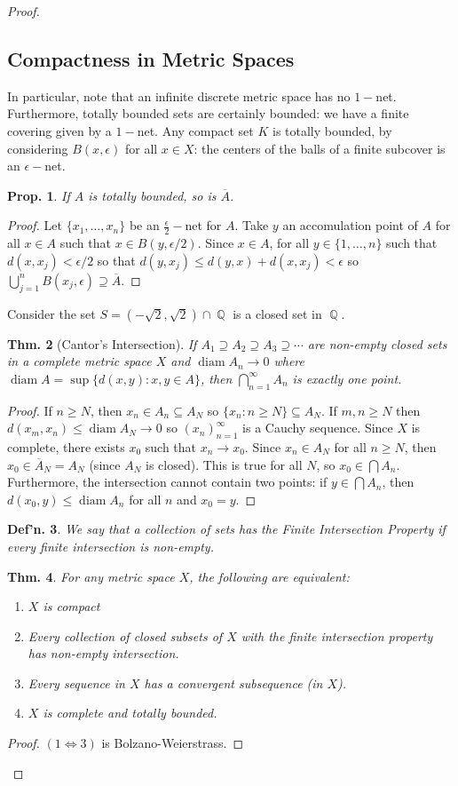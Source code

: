 \documentclass[12pt, a4paper]{book}
\DeclareMathOperator{\Q}{\mathbb{Q}}
\DeclareMathOperator{\diam}{diam}
\newtheorem{theorem}{Thm.}[section]
\newtheorem{definition}[theorem]{Def'n.}
\newtheorem{proposition}[theorem]{Prop.}
\theoremstyle{nonumberplain}
\newtheorem{proof}{Proof}
\begin{document}
\begin{proof}
\subsection{Compactness in Metric Spaces}
In particular, note that an infinite discrete metric space has no $1-$net. Furthermore, totally bounded sets are certainly
bounded: we have a finite covering given by a $1-$net. Any compact set $K$ is totally bounded, by considering $B(x,\epsilon)$
for all $x\in X$: the centers of the balls of a finite subcover is an $\epsilon-$net.
\begin{proposition}
    If $A$ is totally bounded, so is $\overline{A}$.
\end{proposition}
\begin{proof}
    Let $\{x_1,\ldots,x_n\}$ be an $\frac{\epsilon}{2}-$net for $A$. Take $y$ an accomulation point of $A$ for all $x\in A$
    such that $x\in B(y,\epsilon/2)$. Since $x\in A$, for all $y\in\{1,\ldots,n\}$ such that $d(x,x_j)<\epsilon/2$
    so that $d(y,x_j)\leq d(y,x)+d(x,x_j)<\epsilon$ so $\bigcup_{j=1}^n B(x_j,\epsilon)\supseteq\overline{A}$.
\end{proof}
Consider the set $S=(-\sqrt{2},\sqrt{2})\cap\Q$ is a closed set in $\Q$.
\begin{theorem}[Cantor's Intersection]
    If $A_1\supseteq A_2\supseteq A_3\supseteq\cdots$ are non-empty closed sets in a complete metric space $X$ and $\diam A_n\to 0$
    where $\diam A=\sup\{d(x,y):x,y\in A\}$, then $\bigcap_{n=1}^\infty A_n$ is exactly one point.
\end{theorem}
\begin{proof}
    If $n\geq N$, then $x_n\in A_n\subseteq A_N$ so $\{x_n:n\geq N\}\subseteq A_N$. If $m,n\geq N$ then $d(x_m,x_n)\leq\diam A_N\to 0$
    so $(x_n)_{n=1}^\infty$ is a Cauchy sequence. Since $X$ is complete, there exists $x_0$ such that $x_n\to x_0$. Since
    $x_n\in A_N$ for all $n\geq N$, then $x_0\in\overline{A}_N=A_N$ (since $A_N$ is closed). This is true for all $N$, so
    $x_0\in \bigcap A_n$. Furthermore, the intersection cannot contain two points: if $y\in\bigcap A_n$, then $d(x_0,y)\leq\diam A_n$
    for all $n$ and $x_0=y$.
\end{proof}
\begin{definition}
    We say that a collection of sets has the Finite Intersection Property if every finite intersection is non-empty.
\end{definition}
\begin{theorem}
    For any metric space $X$, the following are equivalent:
    \begin{enumerate}
        \item $X$ is compact
        \item Every collection of closed subsets of $X$ with the finite intersection property has non-empty intersection.
        \item Every sequence in $X$ has a convergent subsequence (in $X$).
        \item $X$ is complete and totally bounded.
    \end{enumerate}
\end{theorem}
\begin{proof}
    $(1\Leftrightarrow 3)$ is Bolzano-Weierstrass.


\end{proof}
\end{proof}
\end{document}
